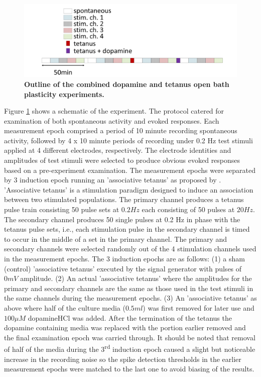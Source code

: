         \label{sec:activity:plasticityProtocol}
        \begin{figure}[!htb]
            \centering
            \includegraphics[width=15cm]{chapter3/figures/ExpOutline/expOutlineTet.jpg}

            \caption[Outline of the combined dopamine-and-tetanus-induced open bath plasticity experiments]{\textbf{Outline of the combined dopamine and tetanus open bath plasticity experiments.}}
            \label{fig:activity:expOutline}
        \end{figure}

    Figure \ref{fig:activity:expOutline} shows a schematic of the experiment. The protocol catered for examination of both spontaneous activity and evoked responses. Each measurement epoch comprised a period of 10 minute recording spontaneous activity, followed by 4 x 10 minute periods of recording under 0.2 Hz test stimuli applied at 4 different electrodes, respectively. The electrode identities and amplitudes of test stimuli were selected to produce obvious evoked responses based on a pre-experiment examination. The measurement epochs were separated by 3 induction epoch running an 'associative tetanus' as proposed by \cite{chiappalone2008network}. 'Associative tetanus' is a stimulation paradigm designed to induce an association between two stimulated populations. The primary channel produces a tetanus pulse train consisting 50 pulse sets at \(0.2 Hz\) each consisting of 50 pulses at \(20 Hz\). The secondary channel produces 50 single pulses at 0.2 Hz in phase with the tetanus pulse sets, i.e., each stimulation pulse in the secondary channel is timed to occur in the middle of a set in the primary channel. The primary and secondary channels were selected randomly out of the 4 stimulation channels used in the measurement epochs. The 3 induction epochs are as follows: (1) a sham (control) 'associative tetanus' executed by the signal generator with pulses of \(0 mV\) amplitude. (2) An actual 'associative tetanus' where the amplitudes for the primary and secondary channels are the same as those used in the test stimuli in the same channels during the measurement epochs. (3) An 'associative tetanus' as above where half of the culture media (\(0.5 ml \)) was first removed for later use and \(100 \mu M\) dopamine\textbullet HCl was added. After the termination of the tetanus the dopamine containing media was replaced with the portion earlier removed and the final examination epoch was carried through. It should be noted that removal of half of the media during the 3\textsuperscript{rd} induction epoch caused a slight but noticeable increase in the recording noise so the spike detection thresholds in the earlier measurement epochs were matched to the last one to avoid biasing of the results.

